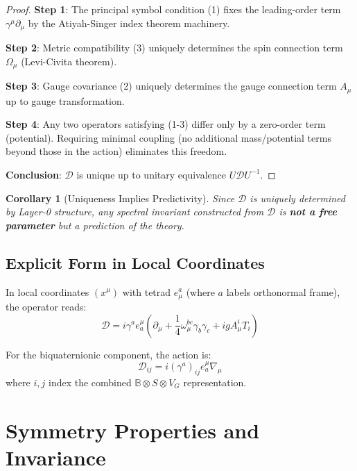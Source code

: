 \documentclass[12pt]{article}
\newtheorem{corollary}[definition]{Corollary}
\newcommand{\B}{\mathbb{B}}
\begin{document}
\begin{proof}
\textbf{Step 1}: The principal symbol condition (1) fixes the leading-order term $\gamma^\mu \partial_\mu$ by the Atiyah-Singer index theorem machinery.

\textbf{Step 2}: Metric compatibility (3) uniquely determines the spin connection term $\Omega_\mu$ (Levi-Civita theorem).

\textbf{Step 3}: Gauge covariance (2) uniquely determines the gauge connection term $A_\mu$ up to gauge transformation.

\textbf{Step 4}: Any two operators satisfying (1-3) differ only by a zero-order term (potential). Requiring minimal coupling (no additional mass/potential terms beyond those in the action) eliminates this freedom.

\textbf{Conclusion}: $\mathcal{D}$ is unique up to unitary equivalence $U \mathcal{D} U^{-1}$.
\end{proof}

\begin{corollary}[Uniqueness Implies Predictivity]
Since $\mathcal{D}$ is uniquely determined by Layer-0 structure, any spectral invariant constructed from $\mathcal{D}$ is \textbf{not a free parameter} but a prediction of the theory.
\end{corollary}

\subsection{Explicit Form in Local Coordinates}

In local coordinates $(x^\mu)$ with tetrad $e_\mu^a$ (where $a$ labels orthonormal frame), the operator reads:
\begin{equation}
\mathcal{D} = i \gamma^a e_a^\mu \left( \partial_\mu + \frac{1}{4}\omega_\mu^{bc} \gamma_b \gamma_c + i g A_\mu^i T_i \right)
\label{eq:dirac_local}
\end{equation}

For the biquaternionic component, the action is:
\begin{equation}
\mathcal{D}_{ij} = i (\gamma^a)_{ij} e_a^\mu \nabla_\mu
\end{equation}
where $i,j$ index the combined $\B \otimes S \otimes V_G$ representation.

\section{Symmetry Properties and Invariance}
\end{document}
